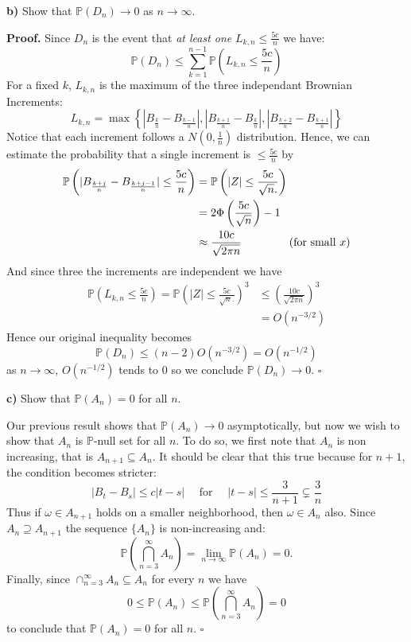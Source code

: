 \documentclass{article}
\begin{document}
\newpage
\begin{tcolorbox}
[colframe=black,colback=gray!5,boxrule=0.5pt]
\textbf{b)} Show that $\mathbb{P}(D_n)\to0$ as $n\to\infty$.
\end{tcolorbox}
\textbf{Proof.} Since $D_n$ is the event that \textit{at least one} $L_{k,n}\leq\frac{5c}{n}$ we have: 
$$\mathbb{P}(D_n) \leq \sum_{k=1}^{n-1}\mathbb{P}\left( L_{k,n} \leq \frac{5c}{n}\right )$$
For a fixed $k$, $L_{k,n}$ is the maximum of the three independant Brownian Increments: 
$$L_{k,n} = \max \left\{ |B_\frac{k}{n} - B_\frac{k-1}{n}|, |B_\frac{k+1}{n} - B_\frac{k}{n}|, |B_\frac{k+2}{n} - B_\frac{k+1}{n}|\right\}$$
Notice that each increment follows a $N(0, \frac{1}{n})$ distribution. Hence, we can estimate the probability that a single increment is $\leq \frac{5c}{n}$ by
\begin{align*}
    \mathbb{P}\left(|B_\frac{k+j}{n} - B_\frac{k+j-1}{n}| \leq \frac{5c}{n}\right) &= \mathbb{P}\left( |Z|\leq \frac{5c}{\sqrt{n}.} \right) \\
    &= 2\Phi\left(\frac{5c}{\sqrt{n}}\right) - 1 \\
    &\approx \frac{10c}{\sqrt{2\pi n}} \hspace{15mm} (\text{for small $x$})
\end{align*}
And since three the increments are independent we have 
\begin{align*}
    \mathbb{P}\left(L_{k,n}\leq \frac{5c}{n}\right) = \mathbb{P}\left( |Z|\leq \frac{5c}{\sqrt{n}.} \right)^3 &\leq \left(\frac{10c}{\sqrt{2\pi n}}\right)^3 \\
    &= O(n^{-3/2})
\end{align*}
Hence our original inequality becomes 
$$\mathbb{P}(D_n) \leq (n-2) O(n^{-3/2}) = O(n^{-1/2})$$
as $n\to\infty$, $O(n^{-1/2})$ tends to 0 so we conclude $\mathbb{P}(D_n)\to0.$ $\square$

\begin{tcolorbox}
[colframe=black,colback=gray!5,boxrule=0.5pt]
\textbf{c)} Show that $\mathbb{P}(A_n) = 0$ for all $n$.
\end{tcolorbox}
Our previous result shows that $\mathbb{P}(A_n) \to0$ asymptotically, but now we wish to show that $A_n$ is $\mathbb{P}$-null set for all $n$. To do so, we first note that $A_n$ is non increasing, that is $A_{n+1}\subseteq A_n$. It should be clear that this true because for $n+1$, the condition becomes stricter: 
$$|B_t - B_s|\leq c|t-s| \quad \text{ for } \quad |t-s|\leq \frac{3}{n+1}\subsetneq \frac{3}{n}$$
Thus if $\omega\in A_{n+1}$ holds on a smaller neighborhood, then $\omega \in A_n$ also. Since $A_n \supseteq A_{n+1}$ the sequence $\{A_n\}$ is non-increasing and: 
$$\mathbb{P}\left(\bigcap_{n=3}^{\infty}A_n\right) = \lim_{n\to\infty}\mathbb{P}(A_n) = 0.$$
Finally, since $\cap_{n=3}^{\infty} A_n\subseteq A_n$ for every $n$ we have 
$$0\leq \mathbb{P}(A_n)\leq \mathbb{P}\left(\bigcap_{n=3}^{\infty}A_n\right) = 0$$
to conclude that $\mathbb{P}(A_n)=0$ for all $n$. $\square$
\end{document}
